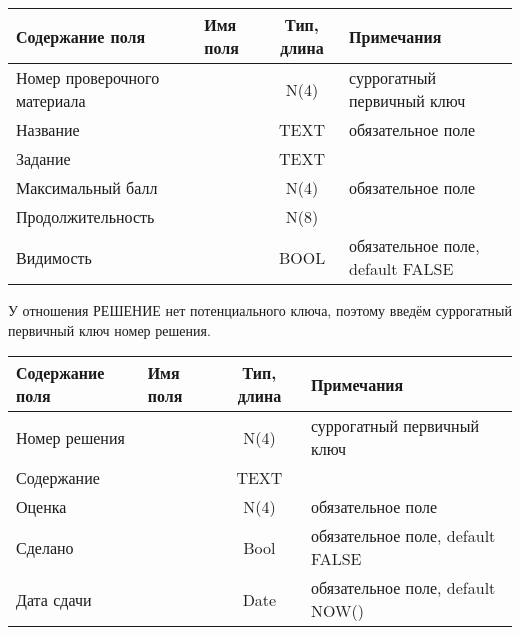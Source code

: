 \documentclass[a4paper,14pt]{article}
\begin{document}
\begin{table}[H]
	\begin{tabular}{|l|l|c|l|}
		\hline
		Содержание поля              & Имя поля & Тип, длина & Примечания                       \\ \hline
		Номер проверочного материала &          &    N(4)    & суррогатный первичный ключ       \\ \hline
		Название                     &          &    TEXT    & обязательное поле                \\ \hline
		Задание                      &          &    TEXT    &                                  \\ \hline
		Максимальный балл            &          &    N(4)    & обязательное поле                \\ \hline
		Продолжительность            &          &    N(8)    &                                  \\ \hline
		Видимость                    &          &    BOOL    & обязательное поле, default FALSE \\ \hline
	\end{tabular}
\end{table}


У отношения РЕШЕНИЕ нет потенциального ключа, поэтому введём суррогатный первичный ключ номер решения.

\begin{table}[H]
	\begin{tabular}{|l|l|c|l|}
		\hline
		Содержание поля & Имя поля & Тип, длина & Примечания                       \\ \hline
		Номер решения   &          &    N(4)    & суррогатный первичный ключ       \\ \hline
		Содержание      &          &    TEXT    &                                  \\ \hline
		Оценка          &          &    N(4)    & обязательное поле                \\ \hline
		Сделано         &          &    Bool    & обязательное поле, default FALSE \\ \hline
		Дата сдачи      &          &    Date    & обязательное поле, default NOW() \\ \hline
	\end{tabular}
\end{table}


%	
\end{document}
